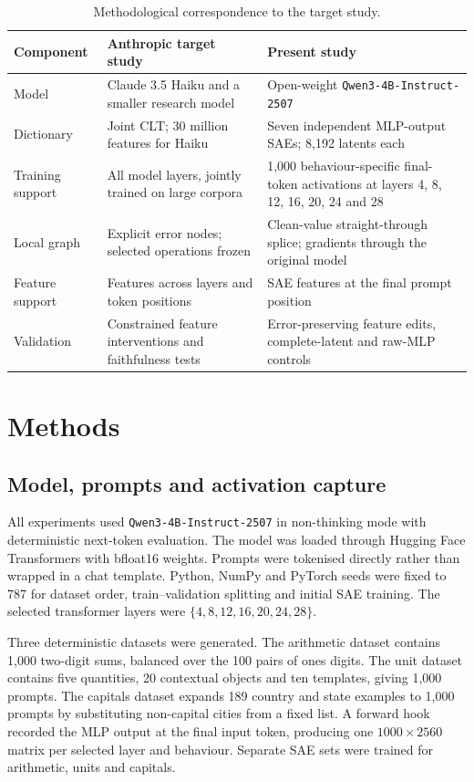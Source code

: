 \documentclass[11pt,a4paper]{article}
\newcommand{\model}{\texttt{Qwen3-4B-Instruct-2507}\xspace}
\begin{document}
    \begin{table}[H]
    \centering
    \caption{Methodological correspondence to the target study.}
    \label{tab:method-comparison}
    \small
    \begin{tabularx}{\textwidth}{p{}XX}
    \toprule Component & Anthropic target study & Present study \\
    \midrule Model & Claude 3.5 Haiku and a smaller research model & Open-weight \model \\
    Dictionary & Joint CLT; 30 million features for Haiku & Seven independent MLP-output SAEs; 8,192 latents each \\
    Training support & All model layers, jointly trained on large corpora & 1,000 behaviour-specific final-token activations at layers 4, 8, 12, 16, 20, 24 and 28 \\
    Local graph & Explicit error nodes; selected operations frozen & Clean-value straight-through splice; gradients through the original model \\
    Feature support & Features across layers and token positions & SAE features at the final prompt position \\
    Validation & Constrained feature interventions and faithfulness tests & Error-preserving feature edits, complete-latent and raw-MLP controls \\
    \bottomrule
    \end{tabularx}
    \end{table}

\section{Methods}

\subsection{Model, prompts and activation capture}

    All experiments used \model in non-thinking mode with deterministic next-token evaluation. The model was loaded through Hugging Face Transformers with bfloat16 weights. Prompts were tokenised directly rather than wrapped in a chat template. Python, NumPy and PyTorch seeds were fixed to 787 for dataset order, train--validation splitting and initial SAE training. The selected transformer layers were $\{4,8,12,16,20,24,28\}$.

    Three deterministic datasets were generated. The arithmetic dataset contains 1,000 two-digit sums, balanced over the 100 pairs of ones digits. The unit dataset contains five quantities, 20 contextual objects and ten templates, giving 1,000 prompts. The capitals dataset expands 189 country and state examples to 1,000 prompts by substituting non-capital cities from a fixed list. A forward hook recorded the MLP output at the final input token, producing one $1000\times2560$ matrix per selected layer and behaviour. Separate SAE sets were trained for arithmetic, units and capitals.
\end{document}
